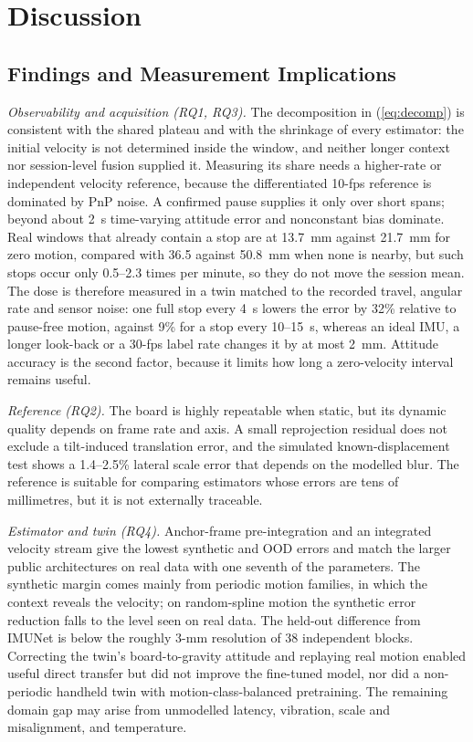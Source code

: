 \section{Discussion}

\subsection{Findings and Measurement Implications}
\emph{Observability and acquisition (RQ1, RQ3).} The decomposition in
(\ref{eq:decomp}) is consistent with the shared plateau and with the shrinkage
of every estimator: the initial velocity is not determined inside the window,
and neither longer context nor session-level fusion supplied it. Measuring its
share needs a higher-rate or independent velocity reference, because the
differentiated 10-fps reference is dominated by PnP noise. A confirmed pause
supplies it only over short spans; beyond about 2~s time-varying attitude
error and nonconstant bias dominate. Real windows that already contain a stop
are at 13.7~mm against 21.7~mm for zero motion, compared with 36.5 against
50.8~mm when none is nearby, but such stops occur only 0.5--2.3 times per
minute, so they do not move the session mean. The dose is therefore measured
in a twin matched to the recorded travel, angular rate and sensor noise: one
full stop every 4~s lowers the error by 32\% relative to pause-free motion,
against 9\% for a stop every 10--15~s, whereas an ideal IMU, a longer look-back
or a 30-fps label rate changes it by at most 2~mm. Attitude accuracy is the
second factor, because it limits how long a zero-velocity interval remains
useful.

\emph{Reference (RQ2).} The board is highly repeatable when static, but its
dynamic quality depends on frame rate and axis. A small reprojection residual
does not exclude a tilt-induced translation error, and the simulated
known-displacement test shows a 1.4--2.5\% lateral scale error that depends on
the modelled blur. The reference is suitable for comparing estimators whose
errors are tens of millimetres, but it is not externally traceable.

\emph{Estimator and twin (RQ4).} Anchor-frame pre-integration and an
integrated velocity stream give the lowest synthetic and OOD errors and match
the larger public architectures on real data with one seventh of the
parameters. The synthetic margin comes mainly from periodic motion families,
in which the context reveals the velocity; on random-spline motion the
synthetic error reduction falls to the level seen on real data. The held-out
difference from IMUNet is below the roughly 3-mm resolution of 38 independent
blocks. Correcting the twin's board-to-gravity
attitude and replaying real motion enabled useful direct transfer but did not
improve the fine-tuned model, nor did a non-periodic handheld twin with
motion-class-balanced pretraining. The remaining domain gap may arise from
unmodelled latency, vibration, scale and misalignment, and temperature.

